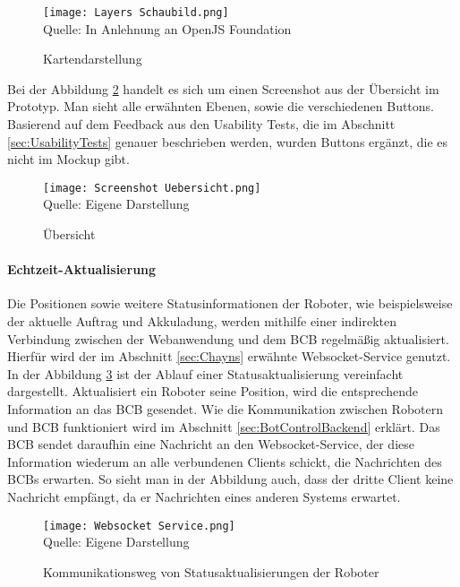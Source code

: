 \begin{figure}[H]
    \caption{Kartendarstellung}\label{fig:MapSchematic}
    \texttt{[image: Layers Schaubild.png]}
    \\
    Quelle: In Anlehnung an OpenJS Foundation \cite{DeckglBaseMaps}
\end{figure}

Bei der Abbildung \ref{fig:OverviewScreenshot} handelt es sich um einen Screenshot aus der Übersicht im Prototyp. Man sieht alle erwähnten Ebenen, sowie die verschiedenen Buttons. Basierend auf dem Feedback aus den Usability Tests, die im Abschnitt \ref{sec:UsabilityTests} genauer beschrieben werden, wurden Buttons ergänzt, die es nicht im \gls{Mockup} gibt.

\begin{figure}[H]
    \caption{Übersicht}\label{fig:OverviewScreenshot}
    \texttt{[image: Screenshot Uebersicht.png]}
    \\
    Quelle: Eigene Darstellung
\end{figure}

\paragraph{Echtzeit-Aktualisierung}
Die Positionen sowie weitere Statusinformationen der Roboter, wie beispielsweise der aktuelle Auftrag und Akkuladung, werden mithilfe einer indirekten Verbindung zwischen der Webanwendung und dem \ac{BCB} regelmäßig aktualisiert. Hierfür wird der im Abschnitt \ref{sec:Chayns} erwähnte \gls{Websocket}-Service genutzt. In der Abbildung \ref{fig:RobotStatusUpdate} ist der Ablauf einer Statusaktualisierung vereinfacht dargestellt. Aktualisiert ein Roboter seine Position, wird die entsprechende Information an das \ac{BCB} gesendet. Wie die Kommunikation zwischen Robotern und \ac{BCB} funktioniert wird im Abschnitt \ref{sec:BotControlBackend} erklärt.
Das \ac{BCB} sendet daraufhin eine Nachricht an den \gls{Websocket}-Service, der diese Information wiederum an alle verbundenen Clients schickt, die Nachrichten des \ac{BCB}s erwarten. So sieht man in der Abbildung auch, dass der dritte Client keine Nachricht empfängt, da er Nachrichten eines anderen Systems erwartet.

\begin{figure}[H]
    \centering
    \caption{Kommunikationsweg von Statusaktualisierungen der Roboter}\label{fig:RobotStatusUpdate}
    \texttt{[image: Websocket Service.png]}
    \\
    Quelle: Eigene Darstellung
\end{figure}

